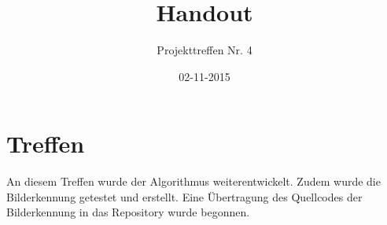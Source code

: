 \documentclass[a4paper,DIV=9,12pt]{scrreprt}
\begin{document}


\onehalfspace

\begin{titlepage}
    \title{Handout}
    \subtitle{Projekttreffen Nr. 4}
    \author{}
    \date{02-11-2015}
    \maketitle
    \thispagestyle{empty}
\end{titlepage}
\setcounter{page}{1}


\chapter{Treffen}

    An diesem Treffen wurde der Algorithmus weiterentwickelt.
    Zudem wurde die Bilderkennung getestet und erstellt.
    Eine Übertragung des Quellcodes der Bilderkennung in das Repository wurde
    begonnen.
\end{document}
